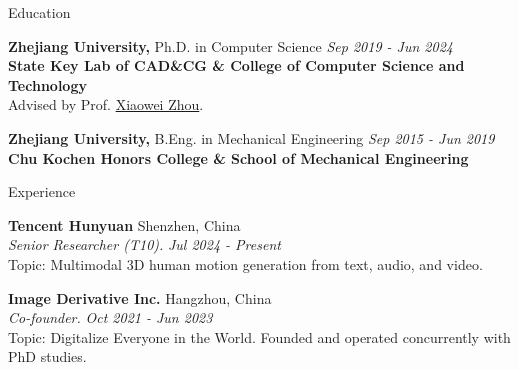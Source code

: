 
\begin{rSection}{Education}

    {\bf Zhejiang University, } Ph.D. in Computer Science \hfill {\em Sep 2019 - Jun 2024}
    {\bf \\State Key Lab of CAD\&CG \& College of Computer Science and Technology}
    \\ Advised by Prof. \href{https://xzhou.me}{Xiaowei Zhou}.

    {\bf Zhejiang University, } B.Eng. in Mechanical Engineering \hfill {\em Sep 2015 - Jun 2019}
    {\bf \\Chu Kochen Honors College \& School of Mechanical Engineering}

\end{rSection}

\begin{rSection}{Experience}

    {\bf Tencent Hunyuan} \hfill Shenzhen, China \\
    {\em Senior Researcher (T10).} \hfill {\em Jul 2024 - Present} \\
    Topic: Multimodal 3D human motion generation from text, audio, and video.

    {\bf Image Derivative Inc.} \hfill Hangzhou, China \\
    {\em Co-founder.} \hfill {\em Oct 2021 - Jun 2023} \\
    Topic: Digitalize Everyone in the World. Founded and operated concurrently with PhD studies.

\end{rSection}

